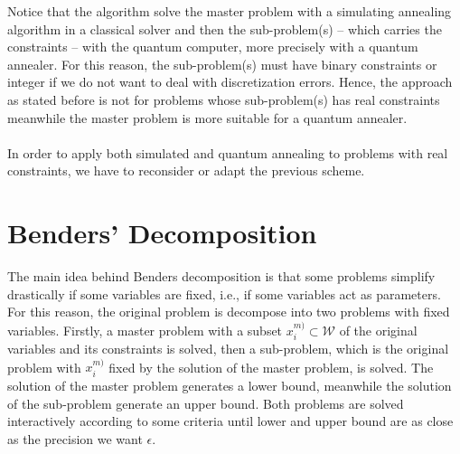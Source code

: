 Notice that the algorithm solve the master problem with a simulating annealing algorithm in a classical solver and then the sub-problem(s) -- which carries the constraints -- with the quantum computer, more precisely with a quantum annealer. For this reason, the sub-problem(s) must have binary constraints or integer if we do not want to deal with discretization errors. Hence, the approach as stated before is not for problems whose sub-problem(s) has real constraints meanwhile the master problem is more suitable for a quantum annealer.\\\\
In order to apply both simulated and quantum annealing to problems with real constraints, we have to reconsider or adapt the previous scheme.

\section{Benders' Decomposition}
The main idea behind Benders decomposition is that some problems simplify drastically if some variables are fixed, i.e., if some variables act as parameters. For this reason, the original problem is decompose into two problems with fixed variables. Firstly, a master problem with a subset $x^{m)}_{i} \subset \mathcal{W}$ of the original variables and its constraints is solved, then a sub-problem, which is the original problem with $x^{m)}_{i}$ fixed by the solution of the master problem, is solved. The solution of the master problem generates a lower bound, meanwhile the solution of the sub-problem generate an upper bound. Both problems are solved interactively according to some criteria until lower and upper bound are as close as the precision we want $\epsilon$.

